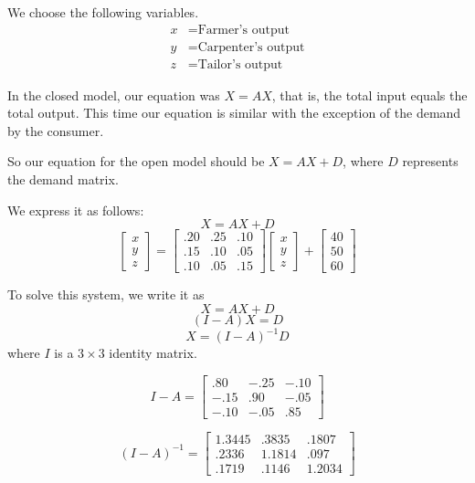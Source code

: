 \begin{solution}
    We choose the following variables.
    \[
        \begin{aligned}
            x & = \text{Farmer's output}    \\
            y & = \text{Carpenter's output} \\
            z & = \text{Tailor's output}
        \end{aligned}
    \]

    In the closed model, our equation was \( X = AX \), that is, the total input equals the total output. This time our equation is similar with the exception of the demand by the consumer.

    So our equation for the open model should be \( X = AX + D \), where \( D \) represents the demand matrix.

    We express it as follows:
    \[ X = AX + D \]
    \[ \begin{bmatrix}
            x \\
            y \\
            z
        \end{bmatrix} = \begin{bmatrix}
            .20 & .25 & .10 \\
            .15 & .10 & .05 \\
            .10 & .05 & .15
        \end{bmatrix} \begin{bmatrix}
            x \\
            y \\
            z
        \end{bmatrix} + \begin{bmatrix}
            40 \\
            50 \\
            60
        \end{bmatrix} \]

    To solve this system, we write it as
    \[ X = AX + D \]
    \[ (I - A)X = D \]
    \[ X = (I - A)^{-1} D \]
    where \( I \) is a \( 3 \times 3 \) identity matrix.

    \[ I - A = \begin{bmatrix}
            .80  & -.25 & -.10 \\
            -.15 & .90  & -.05 \\
            -.10 & -.05 & .85
        \end{bmatrix} \]

    \[ (I - A)^{-1} = \begin{bmatrix}
            1.3445 & .3835  & .1807  \\
            .2336  & 1.1814 & .097   \\
            .1719  & .1146  & 1.2034
        \end{bmatrix} \]


\end{solution}
